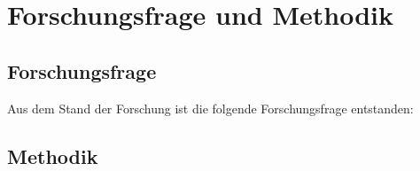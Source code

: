 \chapter{Forschungsfrage und Methodik}
\section{Forschungsfrage}
Aus dem Stand der Forschung ist die folgende Forschungsfrage entstanden:\\

\section{Methodik}

